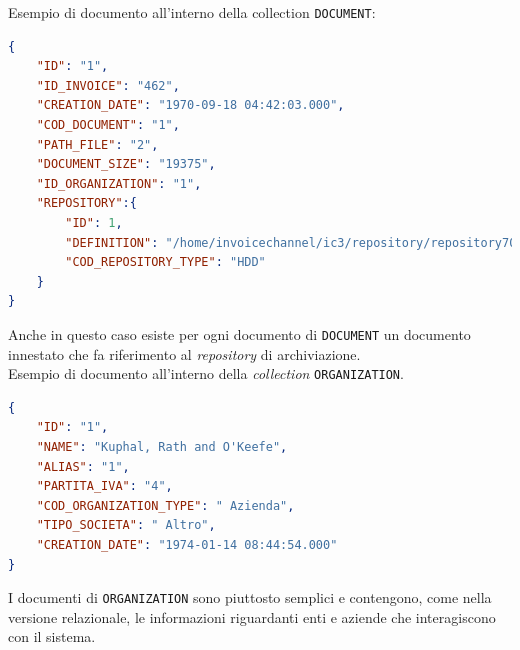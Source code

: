 \noindent Esempio di documento all'interno della collection \texttt{DOCUMENT}:
\begin{lstlisting}[language=json,
        deletekeywords={IDENTITY,INT},
        morekeywords={clustered},    
        framesep=10pt,
        framextopmargin=10pt]
{
    "ID": "1",
    "ID_INVOICE": "462",
    "CREATION_DATE": "1970-09-18 04:42:03.000",
    "COD_DOCUMENT": "1",
    "PATH_FILE": "2",
    "DOCUMENT_SIZE": "19375",
    "ID_ORGANIZATION": "1",
    "REPOSITORY":{
        "ID": 1,
        "DEFINITION": "/home/invoicechannel/ic3/repository/repository70",
        "COD_REPOSITORY_TYPE": "HDD"
    }
}
\end{lstlisting}
\noindent Anche in questo caso esiste per ogni documento di \texttt{DOCUMENT} un documento innestato che fa riferimento al \textit{repository} di archiviazione.\\

\noindent Esempio di documento all'interno della \textit{collection} \texttt{ORGANIZATION}.
\begin{lstlisting}[language=json,
        deletekeywords={IDENTITY,INT},
        morekeywords={clustered},    
        framesep=10pt,
        framextopmargin=10pt]
{
    "ID": "1",
    "NAME": "Kuphal, Rath and O'Keefe",
    "ALIAS": "1",
    "PARTITA_IVA": "4",
    "COD_ORGANIZATION_TYPE": " Azienda",
    "TIPO_SOCIETA": " Altro",
    "CREATION_DATE": "1974-01-14 08:44:54.000"
}
\end{lstlisting}
\noindent I documenti di \texttt{ORGANIZATION} sono piuttosto semplici e contengono, come nella versione relazionale, le informazioni riguardanti enti e aziende che interagiscono con il sistema.\\

